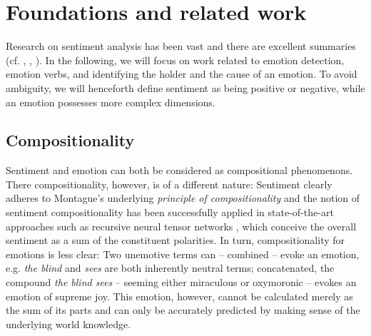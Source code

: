 
\chapter{Foundations and related work} %

\label{ch:foundations} 


Research on sentiment analysis has been vast and there are excellent summaries (cf. \cite{sentiment_analysis_summary_pang}, \cite{sentiment_analysis_summary_liu}, \cite{sentiment_analysis_association_metrics}). In the following, we will focus on work related to emotion detection, emotion verbs, and identifying the holder and the cause of an emotion. To avoid ambiguity, we will henceforth define sentiment as being positive or negative, while an emotion possesses more complex dimensions.

\section{Compositionality} \label{sec:compositionality_section}

Sentiment and emotion can both be considered as compositional phenomenons. There compositionality, however, is of a different nature: Sentiment clearly adheres to Montague's underlying \textit{principle of compositionality} and the notion of sentiment compositionality has been successfully applied in state-of-the-art approaches such as recursive neural tensor networks \cite{deep_sentiment_analysis}, which conceive the overall sentiment as a sum of the constituent polarities. In turn, compositionality for emotions is less clear: Two unemotive terms can -- combined -- evoke an emotion, e.g. \textit{the blind} and \textit{sees} are both inherently neutral terms; concatenated, the compound \textit{the blind sees} -- seeming either miraculous or oxymoronic -- evokes an emotion of supreme joy. This emotion, however, cannot be calculated merely as the sum of its parts and can only be accurately predicted by making sense of the underlying world knowledge.

